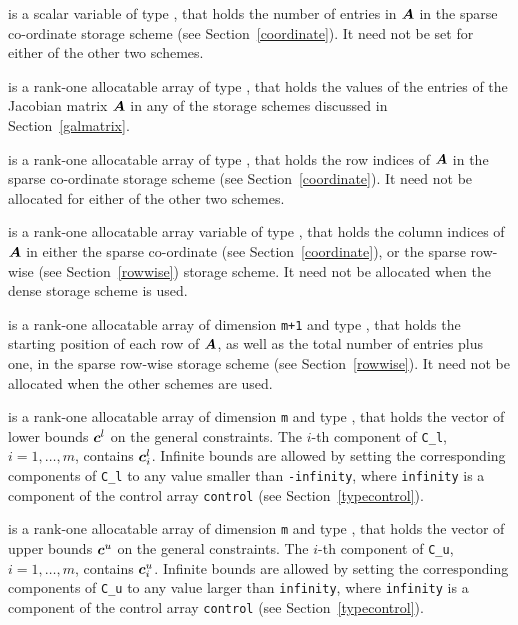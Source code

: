 \documentclass{galahad}
\begin{document}
\begin{description}
\begin{description}
 is a scalar variable of type \integer, that 
holds the number of entries in ${\bm{A}}$
in the sparse co-ordinate storage scheme (see Section~\ref{coordinate}). 
It need not be set for either of the other two schemes.

 is a rank-one allocatable array of type \realdp, that holds
the values of the entries of the Jacobian matrix ${\bm{A}}$ in any of the 
storage schemes discussed in Section~\ref{galmatrix}.

 is a rank-one allocatable array of type \integer,
that holds the row indices of ${\bm{A}}$ in the sparse co-ordinate storage
scheme (see Section~\ref{coordinate}). 
It need not be allocated for either of the other two schemes.

 is a rank-one allocatable array variable of type \integer,
that holds the column indices of ${\bm{A}}$ in either the sparse co-ordinate 
(see Section~\ref{coordinate}), or the sparse row-wise 
(see Section~\ref{rowwise}) storage scheme.
It need not be allocated when the dense storage scheme is used.

 is a rank-one allocatable array of dimension {\tt m+1} and type 
\integer, that holds the 
starting position of each row of ${\bm{A}}$, as well
as the total number of entries plus one, in the sparse row-wise storage
scheme (see Section~\ref{rowwise}). It need not be allocated when the
other schemes are used.

\end{description}

 is a rank-one allocatable array of dimension {\tt m} and type 
\realdp, that holds the vector of lower bounds ${\bm{c}}^{l}$ 
on the general constraints. The $i$-th component of 
{\tt C\_l}, $i = 1, \ldots , m$, contains ${\bm{c}}_{i}^{l}$.
Infinite bounds are allowed by setting the corresponding 
components of {\tt C\_l} to any value smaller than {\tt -infinity}, 
where {\tt infinity} is a component of the control array {\tt control} 
(see Section~\ref{typecontrol}).

 is a rank-one allocatable array of dimension {\tt m} and type 
\realdp, that holds the vector of upper bounds ${\bm{c}}^{u}$ 
on the general constraints. The $i$-th component of 
{\tt C\_u}, $i = 1,  \ldots ,  m$, contains ${\bm{c}}_{i}^{u}$.
Infinite bounds are allowed by setting the corresponding 
components of {\tt C\_u} to any value larger than {\tt infinity}, 
where {\tt infinity} is a component of the control array {\tt control} 
(see Section~\ref{typecontrol}).


\end{description}
\end{document}
